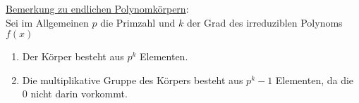 \documentclass[18pt] {article}
\begin{document}
\bigskip
\underline{Bemerkung zu endlichen Polynomkörpern}: \\

Sei im Allgemeinen $p$ die Primzahl und $k$ der Grad des irreduziblen Polynoms $f(x)$
\begin{enumerate}
\item Der Körper besteht aus $p^{k}$ Elementen.

\item Die multiplikative Gruppe des Körpers besteht aus $p^{k} - 1$ Elementen, da die $0$ nicht darin vorkommt.
\end{enumerate}
\end{document}
